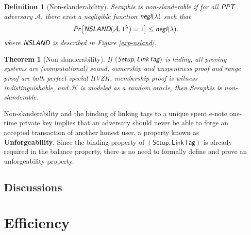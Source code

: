 \documentclass{article}
\newtheorem{definition}{Definition}[section]
\newtheorem{theorem}{Theorem}[section]
\begin{document}
\begin{definition}[Non-slanderability]
Seraphis is non-slanderable if for all $\emph{\textsf{PPT}}$ adversary $\mathcal{A}$, there exist a negligible function $\emph{\textsf{negl}}(\lambda)$ such that
\begin{align*}
\emph{\textsf{Pr}}
\left[
\emph{\textsf{NSLAND}}(\mathcal{A}, 1^{\lambda})=1
\right]
\le \emph{\textsf{negl}}(\lambda).
\end{align*}
where $\emph{\textsf{NSLAND}}$ is described in Figure \ref{exp-nsland}.
\end{definition}
\begin{theorem}[Non-slanderability]\label{thm-nsland}
If $(\emph{\textsf{Setup}},\emph{\textsf{LinkTag}})$ is hiding, all proving systems are (computational) sound, ownership and unspentness proof and range proof are both perfect special HVZK, membership proof is witness indistinguishable, and $\mathcal{H}$ is modeled as a random oracle, then Seraphis is non-slanderable.  
\end{theorem}
Non-slanderability and the binding of linking tags to a unique spent e-note one-time private key implies that an adversary should never be able to forge an accepted transaction of another honest user, a property known as \textbf{Unforgeability}. Since the binding property of $(\textsf{Setup},\textsf{LinkTag})$ is already required in the balance property, there is no need to formally define and prove an unforgeability property.

\subsection{Discussions}\label{sec-disc}

\section{Efficiency}




\appendix
\end{document}
